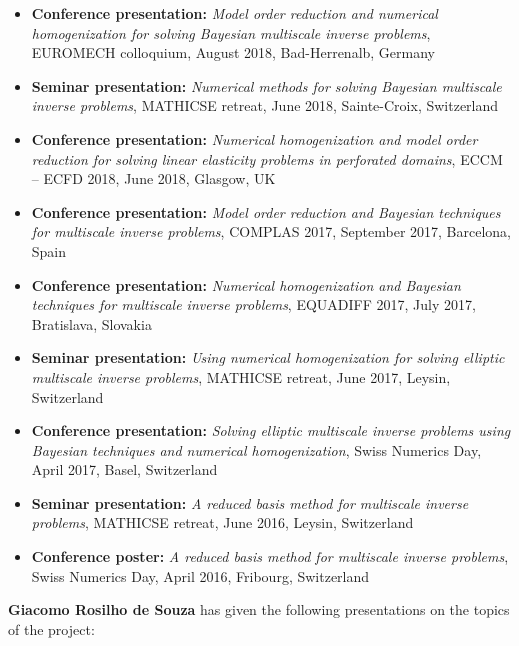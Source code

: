 \documentclass[10pt]{article}
\begin{document}
\begin{itemize}
	\item \textbf{Conference presentation:} \textit{Model order reduction and numerical homogenization for solving Bayesian multiscale inverse problems}, EUROMECH colloquium, August 2018, Bad-Herrenalb, Germany
	\item \textbf{Seminar presentation:} \textit{Numerical methods for solving Bayesian multiscale inverse problems}, MATHICSE retreat, June 2018, Sainte-Croix, Switzerland
	\item \textbf{Conference presentation:} \textit{Numerical homogenization and model order reduction for solving linear elasticity problems in perforated domains}, ECCM -- ECFD 2018, June 2018, Glasgow, UK
	\item \textbf{Conference presentation:} \textit{Model order reduction and Bayesian techniques for multiscale inverse problems}, COMPLAS 2017, September 2017, Barcelona, Spain
	\item \textbf{Conference presentation:} \textit{Numerical homogenization and Bayesian techniques for multiscale inverse problems}, EQUADIFF 2017, July 2017, Bratislava, Slovakia
	\item \textbf{Seminar presentation:} \textit{Using numerical homogenization for solving elliptic multiscale inverse problems}, MATHICSE retreat, June 2017, Leysin, Switzerland
	\item \textbf{Conference presentation:} \textit{Solving elliptic multiscale inverse problems using Bayesian techniques and numerical homogenization}, Swiss Numerics Day, April 2017, Basel, Switzerland
	\item \textbf{Seminar presentation:} \textit{A reduced basis method for multiscale inverse problems}, MATHICSE retreat, June 2016, Leysin, Switzerland
	\item \textbf{Conference poster:} \textit{A reduced basis method for multiscale inverse problems}, Swiss Numerics Day, April 2016, Fribourg, Switzerland
\end{itemize}
%
\textbf{Giacomo Rosilho de Souza} has given the following presentations on the topics of the project:
\end{document}
